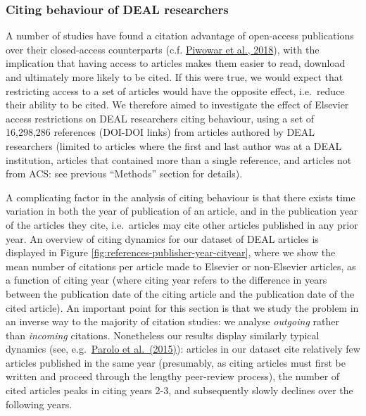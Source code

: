 \documentclass[
]{article}
\begin{document}
\hypertarget{citing-behaviour-of-deal-researchers}{%
\subsubsection{Citing behaviour of DEAL researchers}\label{citing-behaviour-of-deal-researchers}}

A number of studies have found a citation advantage of open-access publications over their closed-access counterparts (c.f. \href{https://doi.org/10.7717/peerj.4375}{Piwowar et al., 2018}), with the implication that having access to articles makes them easier to read, download and ultimately more likely to be cited. If this were true, we would expect that restricting access to a set of articles would have the opposite effect, i.e.~reduce their ability to be cited. We therefore aimed to investigate the effect of Elsevier access restrictions on DEAL researchers citing behaviour, using a set of 16,298,286 references (DOI-DOI links) from articles authored by DEAL researchers (limited to articles where the first and last author was at a DEAL institution, articles that contained more than a single reference, and articles not from ACS: see previous ``Methods'' section for details).

A complicating factor in the analysis of citing behaviour is that there exists time variation in both the year of publication of an article, and in the publication year of the articles they cite, i.e.~articles may cite other articles published in any prior year. An overview of citing dynamics for our dataset of DEAL articles is displayed in Figure \ref{fig:references-publisher-year-cityear}, where we show the mean number of citations per article made to Elsevier or non-Elsevier articles, as a function of citing year (where citing year refers to the difference in years between the publication date of the citing article and the publication date of the cited article). An important point for this section is that we study the problem in an inverse way to the majority of citation studies: we analyse \emph{outgoing} rather than \emph{incoming} citations. Nonetheless our results display similarly typical dynamics (see, e.g.~\href{https://doi.org/10.1016/j.joi.2015.07.006}{Parolo et al.~(2015)}): articles in our dataset cite relatively few articles published in the same year (presumably, as citing articles must first be written and proceed through the lengthy peer-review process), the number of cited articles peaks in citing years 2-3, and subsequently slowly declines over the following years.
\end{document}
